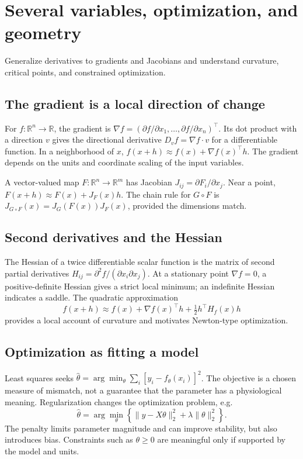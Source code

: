 \chapter{Several variables, optimization, and geometry}\label{ch:multi}
\begin{readergoal}Generalize derivatives to gradients and Jacobians and understand curvature, critical points, and constrained optimization.\end{readergoal}
\section{The gradient is a local direction of change}
For $f:\mathbb R^n\to\mathbb R$, the gradient is $\nabla f=(\partial f/\partial x_1,\ldots,\partial f/\partial x_n)^\top$. Its dot product with a direction $v$ gives the directional derivative $D_vf=\nabla f\cdot v$ for a differentiable function. In a neighborhood of $x$, $f(x+h)\approx f(x)+\nabla f(x)^\top h$. The gradient depends on the units and coordinate scaling of the input variables.

A vector-valued map $F:\mathbb R^n\to\mathbb R^m$ has Jacobian $J_{ij}=\partial F_i/\partial x_j$. Near a point, $F(x+h)\approx F(x)+J_F(x)h$. The chain rule for $G\circ F$ is $J_{G\circ F}(x)=J_G(F(x))J_F(x)$, provided the dimensions match.

\section{Second derivatives and the Hessian}
The Hessian of a twice differentiable scalar function is the matrix of second partial derivatives $H_{ij}=\partial^2f/(\partial x_i\partial x_j)$. At a stationary point $\nabla f=0$, a positive-definite Hessian gives a strict local minimum; an indefinite Hessian indicates a saddle. The quadratic approximation
\[f(x+h)\approx f(x)+\nabla f(x)^\top h+\tfrac12 h^\top H_f(x)h\]
provides a local account of curvature and motivates Newton-type optimization.

\section{Optimization as fitting a model}
Least squares seeks $\hat\theta=\arg\min_\theta\sum_i[y_i-f_\theta(x_i)]^2$. The objective is a chosen measure of mismatch, not a guarantee that the parameter has a physiological meaning. Regularization changes the optimization problem, e.g.
\[\hat\theta=\arg\min_\theta\left\{\|y-X\theta\|_2^2+\lambda\|\theta\|_2^2\right\}.\]
The penalty limits parameter magnitude and can improve stability, but also introduces bias. Constraints such as $\theta\ge0$ are meaningful only if supported by the model and units.

